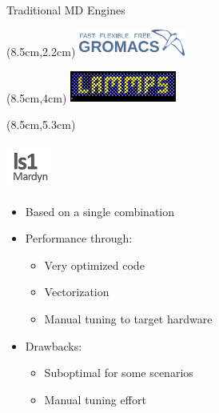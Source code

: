 \documentclass[
	10pt,
	t		%
]{beamer}
\begin{document}
\begin{frame}{Traditional MD Engines}


    \begin{textblock*}{3.5cm}(8.5cm,2.2cm)
        \includegraphics[width=3.5cm]{figures/gromacs-logo.png}
    \end{textblock*}
    \begin{textblock*}{3.5cm}(8.5cm,4cm)
        \includegraphics[width=3.5cm]{figures/lammps-logo.png}
    \end{textblock*}
    \begin{textblock*}{3cm}(8.5cm,5.3cm)
        \begin{center}

            \includegraphics[width=1.5cm]{figures/ls1-logo.png}
        \end{center}
    \end{textblock*}


    \begin{itemize}
        \item Based on a single combination
        \item Performance through:
              \begin{itemize}
                  \item Very optimized code
                  \item Vectorization
                  \item Manual tuning to target hardware
              \end{itemize}
        \item Drawbacks:
              \begin{itemize}
                  \item Suboptimal for some scenarios
                  \item Manual tuning effort
              \end{itemize}
    \end{itemize}

\end{frame}
\end{document}
